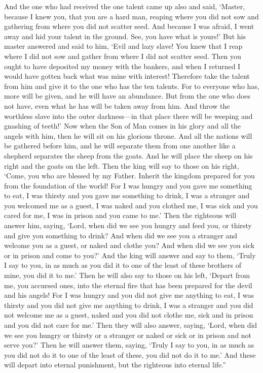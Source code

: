 \begin{biblechapter}
\verse And the one who had received the one talent came up also and said, ‘Master, because I knew you, that you are a hard man, reaping where you did not sow and gathering from where you did not scatter seed.
\verse And because I was afraid, I went away and hid your talent in the ground. See, you have what is yours!’
\verse But his master answered and said to him, ‘Evil and lazy slave! You knew that I reap where I did not sow and gather from where I did not scatter seed.
\verse Then you ought to have deposited my money with the bankers, and when I returned I would have gotten back what was mine with interest!
\verse Therefore take the talent from him and give it to the one who has the ten talents.
\verse For to everyone who has, more will be given, and he will have an abundance. But from the one who does not have, even what he has will be taken away from him.
\verse And throw the worthless slave into the outer darkness—in that place there will be weeping and gnashing of teeth!’
 Now when the Son of Man comes in his glory and all the angels with him, then he will sit on his glorious throne.
\verse And all the nations will be gathered before him, and he will separate them from one another like a shepherd separates the sheep from the goats.
\verse And he will place the sheep on his right and the goats on the left.
\verse Then the king will say to those on his right, ‘Come, you who are blessed by my Father. Inherit the kingdom prepared for you from the foundation of the world!
\verse For I was hungry and you gave me something to eat, I was thirsty and you gave me something to drink, I was a stranger and you welcomed me as a guest,
\verse I was naked and you clothed me, I was sick and you cared for me, I was in prison and you came to me.’
\verse Then the righteous will answer him, saying, ‘Lord, when did we see you hungry and feed you, or thirsty and give you something to drink?
\verse And when did we see you a stranger and welcome you as a guest, or naked and clothe you?
\verse And when did we see you sick or in prison and come to you?’
\verse And the king will answer and say to them, ‘Truly I say to you, in as much as you did it to one of the least of these brothers of mine, you did it to me.’
\verse Then he will also say to those on his left, ‘Depart from me, you accursed ones, into the eternal fire that has been prepared for the devil and his angels!
\verse For I was hungry and you did not give me anything to eat, I was thirsty and you did not give me anything to drink,
\verse I was a stranger and you did not welcome me as a guest, naked and you did not clothe me, sick and in prison and you did not care for me.’
\verse Then they will also answer, saying, ‘Lord, when did we see you hungry or thirsty or a stranger or naked or sick or in prison and not serve you?’
\verse Then he will answer them, saying, ‘Truly I say to you, in as much as you did not do it to one of the least of these, you did not do it to me.’
\verse And these will depart into eternal punishment, but the righteous into eternal life.”
\end{biblechapter}

